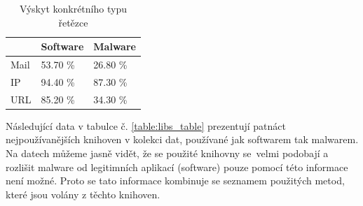 \begin{table}[H]
	\caption{Výskyt konkrétního typu řetězce}
	\label{table:strings_table}

    \centering
	\begin{tabular}{|l|l|l|}
	 	\hline
		     & Software & Malware \\
		\hline
		\hline
		Mail & 53.70 \%   & 26.80 \%  \\	 \hline
		IP   & 94.40 \%   & 87.30 \%  \\	 \hline
		URL  & 85.20 \%   & 34.30 \%  \\	 \hline
	\end{tabular}
\end{table}

Následující data v tabulce č. \ref{table:libs_table} prezentují patnáct nejpoužívanějších knihoven v kolekci dat, používané jak softwarem tak malwarem. Na datech můžeme jasně vidět, že se použité knihovny se~velmi podobají a rozlišit malware od legitimních aplikací (software) pouze pomocí této informace není možné. Proto se tato informace kombinuje se seznamem použitých metod, které jsou volány z těchto knihoven. 

